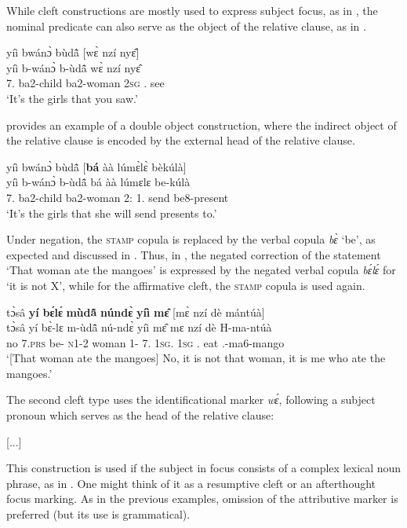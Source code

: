 \noindent While cleft constructions are mostly used to express subject focus, as in , the nominal predicate can also serve as the object of the relative clause, as in .


\ea\label{TREL4} 
  \glll yíì bwánɔ̀ bùdã̂ [wɛ̀ nzí nyɛ̂]\textsubscript{{\REL}} \\
         yíì b-wánɔ̀ b-ùdã̂ {\db}wɛ̀ nzí nyɛ̂ \\
         7.{\COP} ba2-child ba2-woman {\db}2\textsc{sg} {\PROG}.{\PST} see  \\
    \trans `It's the girls that you saw.'
\z

\noindent {} provides an example of a double object construction, where the indirect object of the relative clause is encoded by the external head of the relative clause.


\ea\label{TREL5} 
  \glll yíì bwánɔ̀ bùdã̂ [{\bfseries bá} àà lúmɛ̀lɛ̀ bèkúlà]\textsubscript{{\REL}} \\
         yíì b-wánɔ̀ b-ùdã̂ {\db}bá àà lúmɛlɛ be-kúlà \\
         7.{\COP} ba2-child ba2-woman {\db}2:{\ATT} 1.{\FUT} send be8-present \\
    \trans `It's the girls that she will send presents to.'
\z

Under negation, the \textsc{stamp} copula is replaced by the verbal copula {\itshape bɛ̀} `be', as expected and discussed in . Thus, in , the negated correction of the statement `That woman ate the mangoes' is expressed by the negated verbal copula {\itshape bɛ́lɛ́} for `it is not X', while for the affirmative cleft, the \textsc{stamp} copula is used again.


\ea\label{cleft2}
  \glll tɔ̀sâ {\bfseries yí} {\bfseries bɛ́lɛ́} {\bfseries mùdã̂} {\bfseries núndɛ̀} {\bfseries yíì} {\bfseries mɛ̂} [mɛ̀ nzí dè mántúà]\textsubscript{{\REL}}\\
        tɔ̀sâ yí bɛ̀-lɛ m-ùdã̂ nú-ndɛ̀ yíì mɛ̂ {\db}mɛ nzí dè H-ma-ntúà\\
       no 7.\textsc{prs} be-{\NEG} \textsc{n}1-2 woman 1-{\ANA} 7.{\COP} 1\textsc{sg}.{\OBJ} {\db}1\textsc{sg} {\PROG}.{\PST} eat {\OBJ}.{\LINK}-ma6-mango \\
    \trans `[That woman ate the mangoes{\textemdash}] No, it is not that woman, it is me who ate the mangoes.'
\z

\largerpage
The second cleft type uses the identificational marker {\itshape wɛ́}, following a subject pronoun which serves as the head of the relative clause:
\begin{center}
{\PRO} {\ID} [...]\textsubscript{{\REL}}
\end{center}
This construction is used if the subject in focus consists of a complex lexical noun phrase, as in . One might think of it as a resumptive cleft or an afterthought focus marking. As in the previous examples, omission of the attributive marker is preferred (but its use is grammatical).


